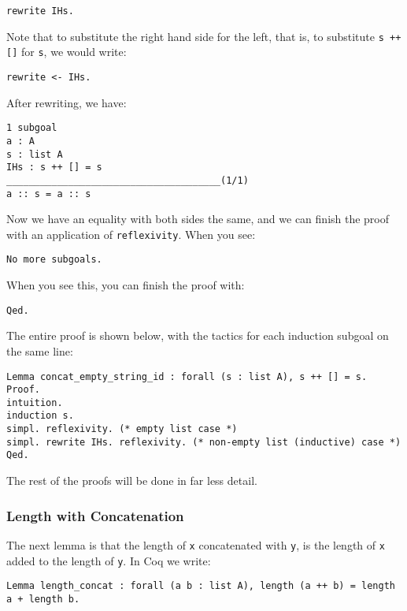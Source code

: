 \begin{verbatim}
rewrite IHs.
\end{verbatim}

Note that to substitute the right hand side for the left, that is, to substitute \texttt{s ++ []} for \texttt{s}, we would write:

\begin{verbatim}
rewrite <- IHs.
\end{verbatim}

After rewriting, we have:

\begin{verbatim}
1 subgoal
a : A
s : list A
IHs : s ++ [] = s
______________________________________(1/1)
a :: s = a :: s
\end{verbatim}

Now we have an equality with both sides the same, and we can finish the proof with an application of \texttt{reflexivity}.
When you see:

\begin{verbatim}
No more subgoals.
\end{verbatim}

When you see this, you can finish the proof with:

\begin{verbatim}
Qed.
\end{verbatim}

The entire proof is shown below, with the tactics for each induction subgoal on the same line:

\begin{verbatim}
Lemma concat_empty_string_id : forall (s : list A), s ++ [] = s.
Proof.
intuition.
induction s.
simpl. reflexivity. (* empty list case *)
simpl. rewrite IHs. reflexivity. (* non-empty list (inductive) case *)
Qed.
\end{verbatim}

The rest of the proofs will be done in far less detail.

\subsubsection{Length with Concatenation}

The next lemma is that the length of \texttt{x} concatenated with \texttt{y}, is the length of \texttt{x} added to the length of \texttt{y}.
In Coq we write:

\begin{verbatim}
Lemma length_concat : forall (a b : list A), length (a ++ b) = length a + length b.
\end{verbatim}

